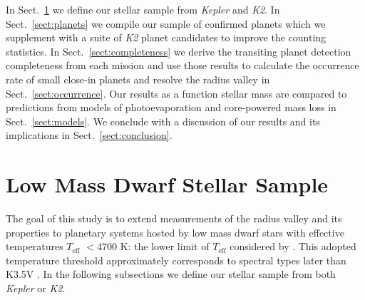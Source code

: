 \documentclass[twocolumn]{emulateapj}
\newcommand{\kepler}[1]{\emph{Kepler}#1}
\newcommand{\ktwo}[1]{\emph{K2}#1}
\newcommand{\teff}[1]{$T_{\text{eff}}$#1}
\begin{document}
In Sect.~\ref{sect:stars} we define our stellar sample from \kepler{} and \ktwo{.}
In Sect.~\ref{sect:planets} we compile our sample of confirmed planets which we supplement with a
suite of \ktwo{} planet candidates to improve the counting statistics.
In Sect.~\ref{sect:completeness}
we derive the transiting planet detection completeness from each mission and use those results to calculate
the occurrence rate of small close-in planets and resolve the radius valley in Sect.~\ref{sect:occurrence}.
Our results as a function stellar mass are compared to
predictions from models of photoevaporation and core-powered mass loss in Sect.~\ref{sect:models}. We conclude 
with a discussion of our results and its implications in Sect.~\ref{sect:conclusion}.


\section{Low Mass Dwarf Stellar Sample} \label{sect:stars}

The goal of this study is to extend measurements of the radius valley and its properties to planetary systems hosted
by low mass dwarf stars with effective temperatures \teff{} $<4700$ K: the lower limit of \teff{}
considered by \cite{fulton18}. This adopted temperature threshold approximately corresponds to spectral types later than
K3.5V \citep{pecaut13}. In the following subsections we define our stellar sample from both \kepler{} or \ktwo{.}
\end{document}

